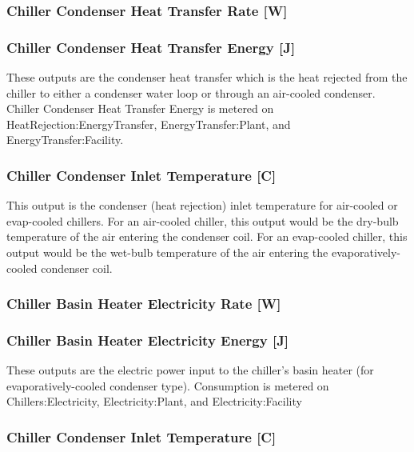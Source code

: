 \subsubsection{Chiller Condenser Heat Transfer Rate {[}W{]}}\label{chiller-condenser-heat-transfer-rate-w}

\subsubsection{Chiller Condenser Heat Transfer Energy {[}J{]}}\label{chiller-condenser-heat-transfer-energy-j}

These outputs are the condenser heat transfer which is the heat rejected from the chiller to either a condenser water loop or through an air-cooled condenser. Chiller Condenser Heat Transfer Energy is metered on HeatRejection:EnergyTransfer, EnergyTransfer:Plant, and EnergyTransfer:Facility.

\subsubsection{Chiller Condenser Inlet Temperature {[}C{]}}\label{chiller-condenser-inlet-temperature-c}

This output is the condenser (heat rejection) inlet temperature for air-cooled or evap-cooled chillers. For an air-cooled chiller, this output would be the dry-bulb temperature of the air entering the condenser coil. For an evap-cooled chiller, this output would be the wet-bulb temperature of the air entering the evaporatively-cooled condenser coil.

\subsubsection{Chiller Basin Heater Electricity Rate {[}W{]}}\label{chiller-basin-heater-electric-power-w}

\subsubsection{Chiller Basin Heater Electricity Energy {[}J{]}}\label{chiller-basin-heater-electric-energy-j}

These outputs are the electric power input to the chiller's basin heater (for evaporatively-cooled condenser type). Consumption is metered on Chillers:Electricity, Electricity:Plant, and Electricity:Facility

\subsubsection{Chiller Condenser Inlet Temperature {[}C{]}}\label{chiller-condenser-inlet-temperature-c-1}

